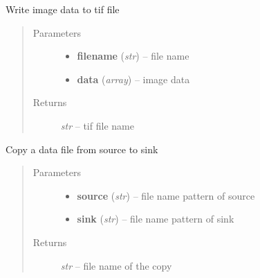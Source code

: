 \documentclass[letterpaper,10pt,english]{sphinxmanual}
\begin{document}

\begin{fulllineitems}
\label{api/ClearMap.IO:ClearMap.IO.TIF.writeData}
Write image data to tif file
\begin{quote}\begin{description}
\item[{Parameters}] \leavevmode\begin{itemize}
\item {} 
\textbf{filename} (\emph{str}) --
file name

\item {} 
\textbf{data} (\emph{array}) --
image data

\end{itemize}

\item[{Returns}] \leavevmode
\emph{str} --
tif file name

\end{description}\end{quote}

\end{fulllineitems}


\begin{fulllineitems}
\label{api/ClearMap.IO:ClearMap.IO.TIF.copyData}
Copy a data file from source to sink
\begin{quote}\begin{description}
\item[{Parameters}] \leavevmode\begin{itemize}
\item {} 
\textbf{source} (\emph{str}) --
file name pattern of source

\item {} 
\textbf{sink} (\emph{str}) --
file name pattern of sink

\end{itemize}

\item[{Returns}] \leavevmode
\emph{str} --
file name of the copy

\end{description}\end{quote}

\end{fulllineitems}
\end{document}
